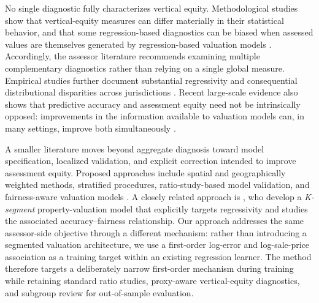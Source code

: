 \documentclass[10pt]{article}
\theoremstyle{definition}
\newcommand{\1}{\mathbf{1}}
\begin{document}
{No single diagnostic fully characterizes vertical equity. Methodological studies show that vertical-equity measures can differ materially in their statistical behavior, and that some regression-based diagnostics can be biased when assessed values are themselves generated by regression-based valuation models} \cite{IAAO2023VerticalReview,McMillenSingh2023}. {Accordingly, the assessor literature recommends examining multiple complementary diagnostics rather than relying on a single global measure.}  {Empirical studies further document substantial regressivity and consequential distributional disparities across jurisdictions} \cite{Berry2021,AvenancioLeonHoward2022}. {Recent large-scale evidence also shows that predictive accuracy and assessment equity need not be intrinsically opposed: improvements in the information available to valuation models can, in many settings, improve both simultaneously \cite{SmithEtAl2026}.}

{A smaller literature moves beyond aggregate diagnosis toward model specification, localized validation, and explicit correction intended to improve assessment equity.} Proposed approaches include spatial and geographically weighted methods, stratified procedures, ratio-study-based model validation, and fairness-aware valuation models \cite{Quintos2014,BidansetEtAl2019,BidansetEtAl2025,HermansEtAl2022,HermansEtAl2025,CandoganHanLu2023}. 
{A closely related approach is \textcite{CandoganHanLu2023}, who develop a \emph{K-segment} property-valuation model that explicitly targets regressivity and studies the associated accuracy--fairness relationship. Our approach addresses the same assessor-side objective through a different mechanism: rather than introducing a segmented valuation architecture, we use a first-order log-error and log-sale-price association as a training target within an existing regression learner. The method therefore targets a deliberately narrow first-order mechanism during training while retaining standard ratio studies, proxy-aware vertical-equity diagnostics, and subgroup review for out-of-sample evaluation.}
\end{document}
